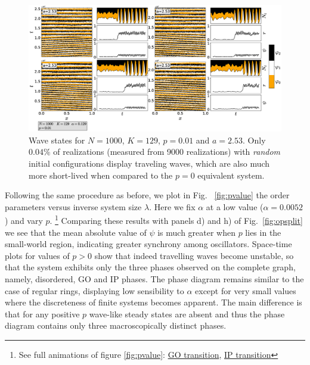 \begin{figure}
\begin{center}
    \includegraphics[width=1.0\textwidth]{fig/rewiredwavetrial.eps}
\caption{\label{fig:trialpanel3} Wave states for $N=1000$, $K=129$, $p=0.01$ and $a=2.53$. Only $0.04\%$ of realizations (measured from
9000 realizations) with \textit{random} initial configurations display traveling waves, which are also much more short-lived when compared
to the $p=0$ equivalent system.}
\end{center}
\end{figure}

Following the same procedure as before, we plot in Fig.~ \ref{fig:pvalue} the order parameters versus inverse system size $\lambda$.
Here we fix $\alpha$ at a low value ($\alpha=0.0052$) and vary $p$.  \footnote{{See full animations of figure \ref{fig:pvalue}:
\href{https://youtu.be/3iHXrDUwbqs}{GO transition}},
\href{https://youtu.be/J9OHw3DycAQ}{IP transition}}
Comparing these results with panels d) and h) of Fig.~\ref{fig:opsplit} we see that the mean absolute value of $\psi$ is much greater
when $p$ lies in the small-world region, indicating greater synchrony among oscillators. Space-time plots for values of $p>0$ show that
indeed travelling waves become unstable, so that the system exhibits only the three phases observed on the complete graph, namely,
disordered, GO and IP phases. The phase diagram remains similar to the case of regular rings, displaying low sensibility to $\alpha$
except for very small values where the discreteness of finite systems becomes apparent. The main difference is that for any positive
$p$ wave-like steady states are absent and thus the phase diagram contains only three macroscopically distinct phases.

